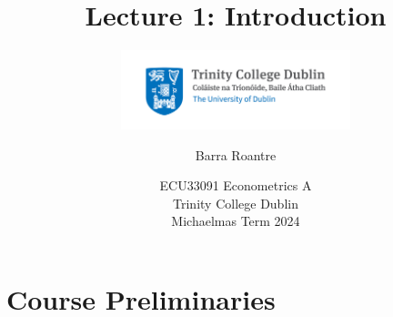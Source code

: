 \documentclass[11pt,english]{beamer}
\subtitle{
    \includegraphics[width=0.50\textwidth]{TCDlogo.jpg}
}
\makeatletter
\let\origtableofcontents=\tableofcontents
\def\tableofcontents{\@ifnextchar[{\origtableofcontents}{\gobbletableofcontents}}
\def\gobbletableofcontents#1{\origtableofcontents}
\makeatother
\begin{document}
\begin{frame}[noframenumbering]{}
\vspace{0.5cm}
\title[]{Lecture 1: Introduction}
\author{Barra Roantre}
\date{ECU33091 Econometrics A \\ Trinity College Dublin \\ Michaelmas Term 2024} 
\titlepage {\small{}\ }\thispagestyle{empty} \vspace{-30pt}

\end{frame}
 

\begin{frame}
	\tableofcontents[hideallsubsections]
\end{frame}


\section{Course Preliminaries}
\end{document}
